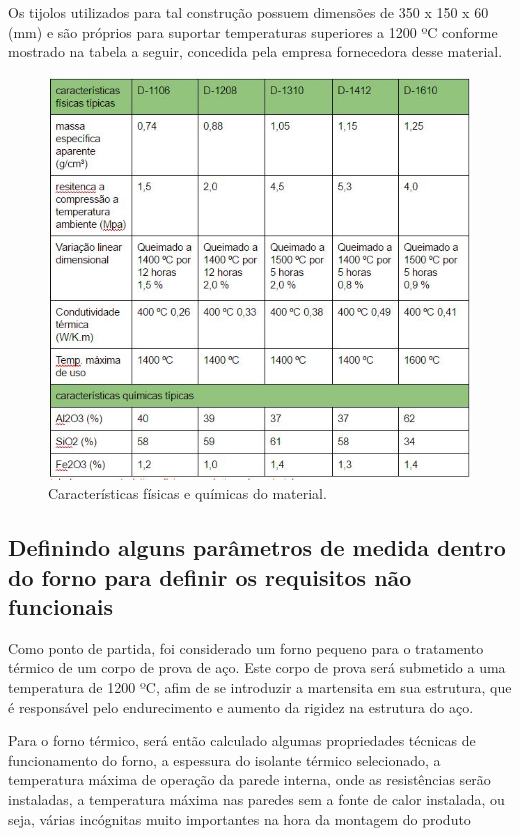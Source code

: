 Os tijolos utilizados para tal construção possuem dimensões de 350 x 150 x 60 (mm) e são próprios para suportar temperaturas superiores a 1200 ºC conforme mostrado na tabela a seguir, concedida pela empresa fornecedora desse material.

\begin{figure}[h]
	\centering
	\label{tabela_dimensoes}
	\includegraphics[keepaspectratio=true,scale=1.0]{figuras/tabela_dimensoes.JPG}
	\caption{Características físicas e químicas do material.}
\end{figure}

\subsection{Definindo alguns parâmetros de medida dentro do forno para definir os requisitos não funcionais}

Como ponto de partida, foi considerado um forno pequeno para o tratamento térmico de um corpo de prova de aço. Este corpo de prova será submetido a uma temperatura de 1200 ºC, afim de se introduzir a martensita em sua estrutura, que é responsável pelo endurecimento e aumento da rigidez na estrutura do aço.

Para o forno térmico, será então calculado algumas propriedades técnicas de funcionamento do forno, a espessura do isolante térmico selecionado, a temperatura máxima de operação da parede interna, onde as resistências serão instaladas, a temperatura máxima nas paredes sem a fonte de calor instalada, ou seja, várias incógnitas muito importantes na hora da montagem do produto

